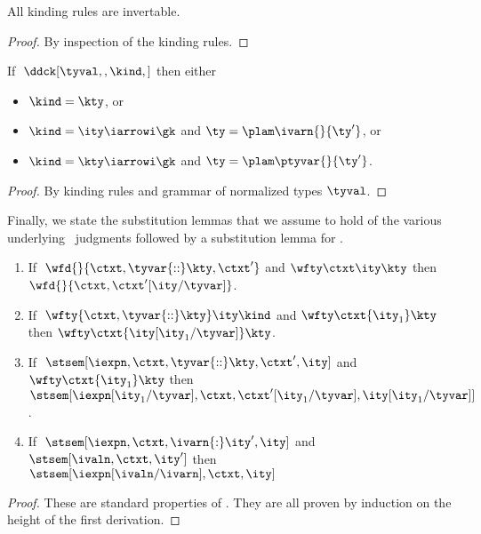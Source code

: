 \begin{lemma}
  All kinding rules are invertable.
  \label{lemma:inversion}
\end{lemma}
\begin{proof}
  By inspection of the kinding rules.
\end{proof}

\begin{lemma}
  If $\; \ddck[\tyval,,\kind,]$ then either
  \begin{itemize}
  \item $\kind = \kty$, or
  \item $\kind = \ity \iarrowi \gk$ and $\ty = \plam \ivarn {} {\ty'}$, or
  \item $\kind = \kty \iarrowi \gk$ and $\ty = \plam \ptyvar {} {\ty'}$.
  \end{itemize}
\label{lemma:norm-canon-form}
\end{lemma}
\begin{proof}
  By kinding rules and grammar of normalized types $\tyval$.
\end{proof}

Finally, we state the substitution lemmas that we assume to hold of
the various underlying \fomega\ judgments followed by a substitution
lemma for \ddc{}.

\begin{lemma}
  \begin{enumerate}
  \item If $\;\wfd{}{\ctxt,\tyvar{::}\kty,\ctxt'}$ and $\wfty \ctxt \ity
    \kty$ then $\wfd{}{\ctxt,\ctxt'[\ity/\tyvar]}$.
  \item If $\;\wfty {\ctxt,\tyvar{::}\kty} \ity \kind$ and $\wfty \ctxt {\ity_1} \kty$ then
    $\wfty \ctxt {\ity[\ity_1/\tyvar]} \kty$.
  \item If $\;\stsem[\iexpn,{\ctxt,\tyvar{::}\kty,\ctxt'},\ity]$ and $\wfty \ctxt {\ity_1}
    \kty$ then
    $\stsem[{\iexpn[\ity_1/\tyvar]},{\ctxt,\ctxt'[\ity_1/\tyvar]}, {\ity[\ity_1/\tyvar]}]$.
  \item If $\;\stsem[\iexpn,{\ctxt,\ivarn{:}\ity'},\ity]$ and 
    $\stsem[\ivaln,\ctxt,\ity']$ then 
    $\stsem[{\iexpn[\ivaln/\ivarn]},\ctxt,\ity]$
  \end{enumerate}
  \label{lemma:fomega-subst}
\end{lemma}

\begin{proof}
  These are standard properties of \fomega. They are all proven by
  induction on the height of the first derivation.
\end{proof}

